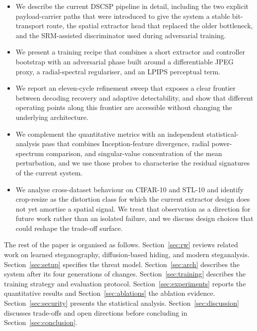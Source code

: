 \documentclass[journal]{IEEEtran}
\begin{document}
\begin{itemize}
    \item We describe the current DSCSP pipeline in detail,
    including the two explicit payload-carrier paths that were
    introduced to give the system a stable bit-transport route, the
    spatial extractor head that replaced the older bottleneck, and
    the SRM-assisted discriminator used during adversarial training.
    \item We present a training recipe that combines a short
    extractor and controller bootstrap with an adversarial phase
    built around a differentiable JPEG proxy, a radial-spectral
    regulariser, and an LPIPS perceptual term.
    \item We report an eleven-cycle refinement sweep that exposes a
    clear frontier between decoding recovery and adaptive
    detectability, and show that different operating points along
    this frontier are accessible without changing the underlying
    architecture.
    \item We complement the quantitative metrics with an independent
    statistical-analysis pass that combines Inception-feature
    divergence, radial power-spectrum comparison, and
    singular-value concentration of the mean perturbation, and we
    use those probes to characterise the residual signatures of the
    current system.
    \item We analyse cross-dataset behaviour on CIFAR-10 and STL-10
    and identify crop-resize as the distortion class for which the
    current extractor design does not yet amortise a spatial
    signal. We treat that observation as a direction for future
    work rather than an isolated failure, and we discuss design
    choices that could reshape the trade-off surface.
\end{itemize}

The rest of the paper is organised as follows. Section~\ref{sec:rw}
reviews related work on learned steganography, diffusion-based
hiding, and modern steganalysis. Section~\ref{sec:setup} specifies
the threat model. Section~\ref{sec:arch} describes the system after
its four generations of changes. Section~\ref{sec:training} describes
the training strategy and evaluation protocol.
Section~\ref{sec:experiments} reports the quantitative results and
Section~\ref{sec:ablations} the ablation evidence.
Section~\ref{sec:security} presents the statistical analysis.
Section~\ref{sec:discussion} discusses trade-offs and open directions
before concluding in Section~\ref{sec:conclusion}.
\end{document}
